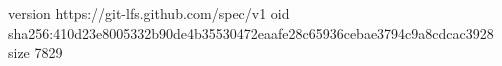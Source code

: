 version https://git-lfs.github.com/spec/v1
oid sha256:410d23e8005332b90de4b35530472eaafe28c65936cebae3794c9a8cdcac3928
size 7829
